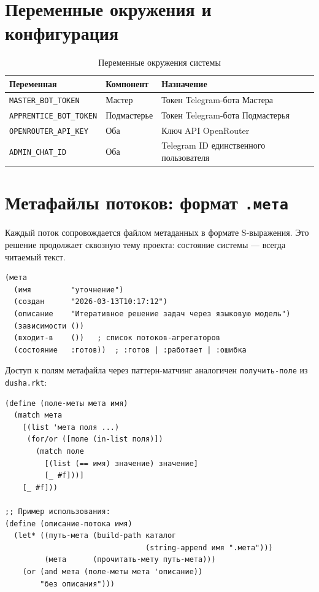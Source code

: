 \documentclass[11pt,a4paper]{article}
\begin{document}
\section{Переменные окружения и конфигурация}

\begin{table}[H]
\centering
\begin{tabular}{lll}
\toprule
\textbf{Переменная} & \textbf{Компонент} & \textbf{Назначение} \\
\midrule
\texttt{MASTER\_BOT\_TOKEN}     & Мастер      & Токен Telegram-бота Мастера \\
\texttt{APPRENTICE\_BOT\_TOKEN} & Подмастерье & Токен Telegram-бота Подмастерья \\
\texttt{OPENROUTER\_API\_KEY}   & Оба         & Ключ API OpenRouter \\
\texttt{ADMIN\_CHAT\_ID}        & Оба         & Telegram ID единственного пользователя \\
\bottomrule
\end{tabular}
\caption{Переменные окружения системы}
\end{table}

\section{Метафайлы потоков: формат \texttt{.мета}}

Каждый поток сопровождается файлом метаданных в формате S-выражения.
Это решение продолжает сквозную тему проекта: состояние системы — всегда
читаемый текст.

\begin{lstlisting}[language=Racket, caption={Формат файла метаданных потока}]
(мета
  (имя         "уточнение")
  (создан      "2026-03-13T10:17:12")
  (описание    "Итеративное решение задач через языковую модель")
  (зависимости ())
  (входит-в    ())   ; список потоков-агрегаторов
  (состояние   :готов))  ; :готов | :работает | :ошибка
\end{lstlisting}

Доступ к полям метафайла через паттерн-матчинг аналогичен \texttt{получить-поле} из \texttt{dusha.rkt}:

\begin{lstlisting}[language=Racket, caption={Чтение метаданных потока}]
(define (поле-меты мета имя)
  (match мета
    [(list 'мета поля ...)
     (for/or ([поле (in-list поля)])
       (match поле
         [(list (== имя) значение) значение]
         [_ #f]))]
    [_ #f]))

;; Пример использования:
(define (описание-потока имя)
  (let* ((путь-мета (build-path каталог
                                (string-append имя ".мета")))
         (мета      (прочитать-мету путь-мета)))
    (or (and мета (поле-меты мета 'описание))
        "без описания")))
\end{lstlisting}
\end{document}
